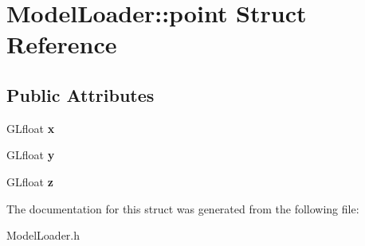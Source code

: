 \hypertarget{structModelLoader_1_1point}{
\section{ModelLoader::point Struct Reference}
\label{structModelLoader_1_1point}
}
\subsection*{Public Attributes}
\begin{DoxyCompactItemize}
\item 
\hypertarget{structModelLoader_1_1point_a9181ecbd09f8ac975b0979820ca1764f}{
GLfloat {\bfseries x}}
\label{structModelLoader_1_1point_a9181ecbd09f8ac975b0979820ca1764f}

\item 
\hypertarget{structModelLoader_1_1point_ad698d96b1ffc1ec5995d27bc06002716}{
GLfloat {\bfseries y}}
\label{structModelLoader_1_1point_ad698d96b1ffc1ec5995d27bc06002716}

\item 
\hypertarget{structModelLoader_1_1point_a26c0891fc203a53111bb3df17e654b9a}{
GLfloat {\bfseries z}}
\label{structModelLoader_1_1point_a26c0891fc203a53111bb3df17e654b9a}

\end{DoxyCompactItemize}


The documentation for this struct was generated from the following file:\begin{DoxyCompactItemize}
\item 
ModelLoader.h\end{DoxyCompactItemize}
